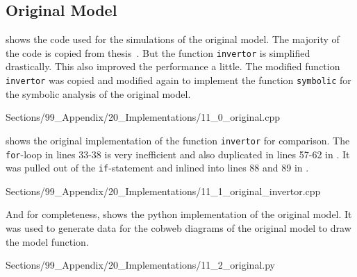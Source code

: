 \subsection{Original Model}

 shows the code used for the simulations of the original model.
The majority of the code is copied from  thesis~\cite{akyuz2022}.
But the function \texttt{invertor} is simplified drastically.
This also improved the performance a little.
The modified function \texttt{invertor} was copied and modified again to implement the function \texttt{symbolic} for the symbolic analysis of the original model.


{Sections/99_Appendix/20_Implementations/11_0_original.cpp}

 shows the original implementation of the function \texttt{invertor} for comparison.
The \texttt{for}-loop in lines 33-38 is very inefficient and also duplicated in lines 57-62 in .
It was pulled out of the \texttt{if}-statement and inlined into lines 88 and 89 in .


{Sections/99_Appendix/20_Implementations/11_1_original_invertor.cpp}

And for completeness,  shows the python implementation of the original model.
It was used to generate data for the cobweb diagrams of the original model to draw the model function.


{Sections/99_Appendix/20_Implementations/11_2_original.py}
